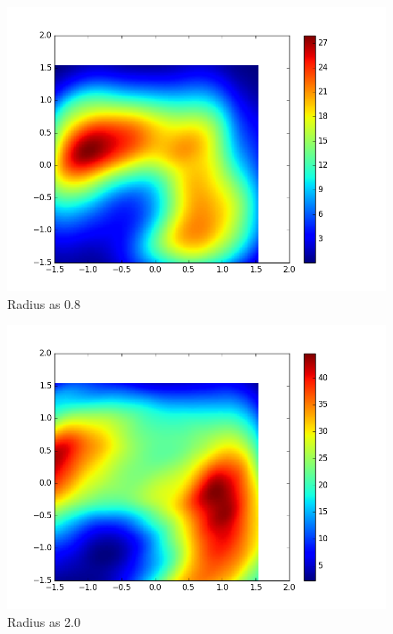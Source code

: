 \documentclass[notitlepage]{report}
\theoremstyle{definition}
\begin{document}
\begin{figure}[H]
  \centering
  \begin{minipage}[b]{0.8\textwidth}
    \includegraphics[width=\textwidth]{LossPlot-2.png}
    \caption{Radius as 0.8}
  \end{minipage}
  \hfill
\end{figure}

\begin{figure}[H]
  \centering
  \begin{minipage}[b]{0.8\textwidth}
    \includegraphics[width=\textwidth]{LossPlot-3.png}
    \caption{Radius as 2.0}
  \end{minipage}
  \hfill
\end{figure}
\end{document}
